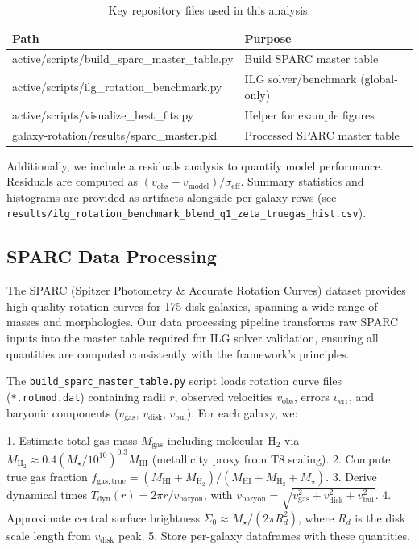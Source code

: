 \documentclass[fleqn,usenatbib]{mnras}
\begin{document}
\begin{table}[h]
\centering
\caption{Key repository files used in this analysis.}
\label{tab:files}
\begin{tabular}{l l}
\toprule
Path & Purpose \\
\midrule
active/scripts/build\_sparc\_master\_table.py & Build SPARC master table \\
active/scripts/ilg\_rotation\_benchmark.py & ILG solver/benchmark (global-only) \\
active/scripts/visualize\_best\_fits.py & Helper for example figures \\
galaxy-rotation/results/sparc\_master.pkl & Processed SPARC master table \\
\bottomrule
\end{tabular}
\end{table}

Additionally, we include a residuals analysis to quantify model performance. Residuals are computed as $(v_\mathrm{obs} - v_\mathrm{model}) / \sigma_\mathrm{eff}$. Summary statistics and histograms are provided as artifacts alongside per-galaxy rows (see \texttt{results/ilg\_rotation\_benchmark\_blend\_q1\_zeta\_truegas\_hist.csv}).

\subsection{SPARC Data Processing}

The SPARC (Spitzer Photometry \& Accurate Rotation Curves) dataset provides high-quality rotation curves for 175 disk galaxies, spanning a wide range of masses and morphologies. Our data processing pipeline transforms raw SPARC inputs into the master table required for ILG solver validation, ensuring all quantities are computed consistently with the framework's principles.

The \texttt{build\_sparc\_master\_table.py} script loads rotation curve files (\texttt{*.rotmod.dat}) containing radii $r$, observed velocities $v_\mathrm{obs}$, errors $v_\mathrm{err}$, and baryonic components ($v_\mathrm{gas}$, $v_\mathrm{disk}$, $v_\mathrm{bul}$). For each galaxy, we:

1. Estimate total gas mass $M_\mathrm{gas}$ including molecular H$_2$ via $M_\mathrm{H_2} \approx 0.4 (M_\star / 10^{10})^{0.3} M_\mathrm{HI}$ (metallicity proxy from T8 scaling).
2. Compute true gas fraction $f_\mathrm{gas,true} = (M_\mathrm{HI} + M_\mathrm{H_2}) / (M_\mathrm{HI} + M_\mathrm{H_2} + M_\star)$.
3. Derive dynamical times $T_\mathrm{dyn}(r) = 2\pi r / v_\mathrm{baryon}$, with $v_\mathrm{baryon} = \sqrt{v_\mathrm{gas}^2 + v_\mathrm{disk}^2 + v_\mathrm{bul}^2}$.
4. Approximate central surface brightness $\Sigma_0 \approx M_\star / (2\pi R_d^2)$, where $R_d$ is the disk scale length from $v_\mathrm{disk}$ peak.
5. Store per-galaxy dataframes with these quantities.
\end{document}
